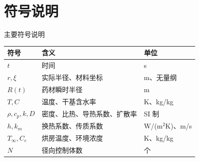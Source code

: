\section{符号说明}

\begin{center}
  {\fontsize{12pt}{14.4pt}\heiti 主要符号说明}\\[0.6em]
  \begin{tabular}{lll}
    \toprule
    \textbf{符号} & \textbf{含义} & \textbf{单位} \\
    \midrule
    $t$ & 时间 & s \\
    $r,\xi$ & 实际半径、材料坐标 & m、无量纲 \\
    $R(t)$ & 药材瞬时半径 & m \\
    $T,C$ & 温度、干基含水率 & K、kg/kg \\
    $\rho,c_p,k,D$ & 密度、比热、导热系数、扩散率 & SI 制 \\
    $h,k_m$ & 换热系数、传质系数 & W/(m$^2$K)、m/s \\
    $T_\infty,C_e$ & 烘房温度、环境浓度 & K、kg/kg \\
    $N$ & 径向控制体数 & 个 \\
    \bottomrule
  \end{tabular}
\end{center}
